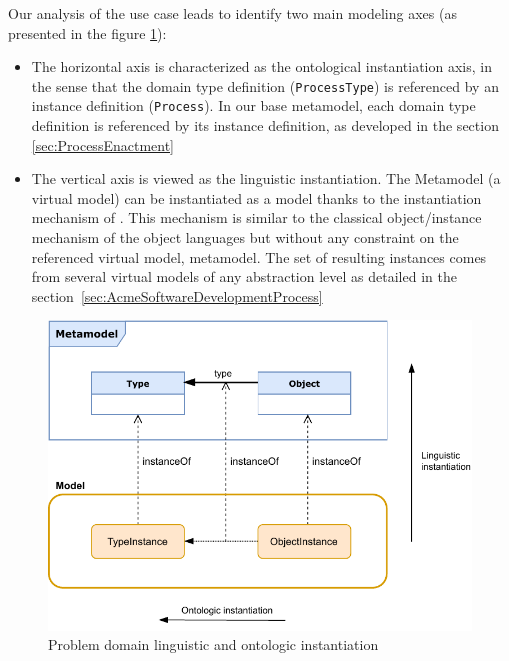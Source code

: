 Our analysis of the use case leads to identify two main modeling axes (as presented in the figure \ref{fig:LinguisticAndOntologicInstantiation}):
\begin{itemize}
    \item The horizontal axis is characterized as the ontological instantiation axis, in the sense that the domain type definition (\ie \texttt{ProcessType}) is referenced by an instance definition (\ie \texttt{Process}). In our base metamodel, each domain type definition is referenced by its instance definition, as developed in the section \ref{sec:ProcessEnactment}

\item The vertical axis is viewed as the linguistic instantiation. The Metamodel (a virtual model) can be instantiated as a model thanks to the instantiation mechanism of \FML. This mechanism is similar to the classical object/instance mechanism of the object languages but without any constraint on the referenced virtual model, \ie metamodel. The set of resulting instances comes from several virtual models of any abstraction level as detailed in the section~\ref{sec:AcmeSoftwareDevelopmentProcess}



\end{itemize}

\begin{figure}
    \centering
    \includegraphics[width=1.0 \columnwidth]{Figures/Instantiation.pdf}
    \caption{Problem  domain linguistic and ontologic instantiation}
    \label{fig:LinguisticAndOntologicInstantiation}
\end{figure}


